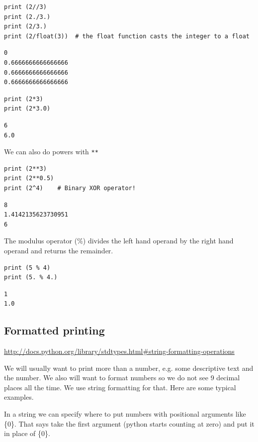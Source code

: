 \documentclass[11pt]{article}
\begin{document}
\begin{verbatim}
print (2//3)
print (2./3.)
print (2/3.)
print (2/float(3))  # the float function casts the integer to a float
\end{verbatim}

\begin{verbatim}
0
0.6666666666666666
0.6666666666666666
0.6666666666666666
\end{verbatim}

\begin{verbatim}
print (2*3)
print (2*3.0)
\end{verbatim}

\begin{verbatim}
6
6.0
\end{verbatim}

We can also do powers with \texttt{**}

\begin{verbatim}
print (2**3)
print (2**0.5)
print (2^4)    # Binary XOR operator!
\end{verbatim}

\begin{verbatim}
8
1.4142135623730951
6
\end{verbatim}

The modulus operator (\%) divides the left hand operand by the right hand operand and returns the remainder.

\begin{verbatim}
print (5 % 4)
print (5. % 4.)
\end{verbatim}

\begin{verbatim}
1
1.0
\end{verbatim}


\subsection{Formatted printing}
\label{sec:org65ac0cb}
\url{http://docs.python.org/library/stdtypes.html\#string-formatting-operations}

We will usually want to print more than a number, e.g. some descriptive text and the number. We also will want to format numbers so we do not see 9 decimal places all the time. We use string formatting for that. Here are some typical examples.

In a string we can specify where to put numbers with positional arguments like \{0\}. That says take the first argument (python starts counting at zero) and put it in place of \{0\}.
\end{document}
